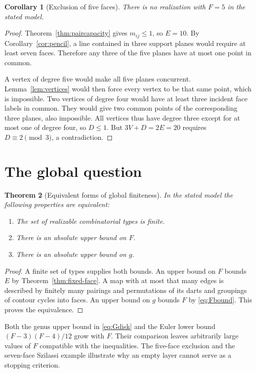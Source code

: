 \documentclass[11pt,a4paper]{article}
\newtheorem{theorem}{Theorem}[section]
\newtheorem{corollary}[theorem]{Corollary}
\theoremstyle{definition}
\begin{document}
\begin{corollary}[Exclusion of five faces]\label{cor:five}
There is no realization with $F=5$ in the stated model.
\end{corollary}

\begin{proof}
Theorem~\ref{thm:paircapacity} gives $m_{ij}\leq1$, so $E=10$.
By Corollary~\ref{cor:pencil}, a line contained in three support planes
would require at least seven faces. Therefore any three of the five
planes have at most one point in common.

A vertex of degree five would make all five planes concurrent.
Lemma~\ref{lem:vertices} would then force every vertex to be that same
point, which is impossible. Two vertices of degree four would have at
least three incident face labels in common. They would give two common
points of the corresponding three planes, also impossible. All vertices
thus have degree three except for at most one of degree four, so $D\leq1$.
But $3V+D=2E=20$ requires $D\equiv2\pmod3$, a contradiction.
\end{proof}

\section{The global question}\label{sec:global}

\begin{theorem}[Equivalent forms of global finiteness]\label{thm:global}
In the stated model the following properties are equivalent:
\begin{enumerate}
\item The set of realizable combinatorial types is finite.
\item There is an absolute upper bound on $F$.
\item There is an absolute upper bound on $g$.
\end{enumerate}
\end{theorem}

\begin{proof}
A finite set of types supplies both bounds. An upper bound on $F$ bounds
$E$ by Theorem~\ref{thm:fixed-face}. A map with at most that many edges is
described by finitely many pairings and permutations of its darts and
groupings of contour cycles into faces. An upper bound on $g$ bounds $F$
by \eqref{eq:Fbound}. This proves the equivalence.
\end{proof}

Both the genus upper bound in \eqref{eq:Gdisk} and the Euler lower bound
$(F-3)(F-4)/12$ grow with $F$. Their comparison leaves arbitrarily large
values of $F$ compatible with the inequalities. The five-face exclusion
and the seven-face Szilassi example illustrate why an empty layer cannot
serve as a stopping criterion.
\end{document}
